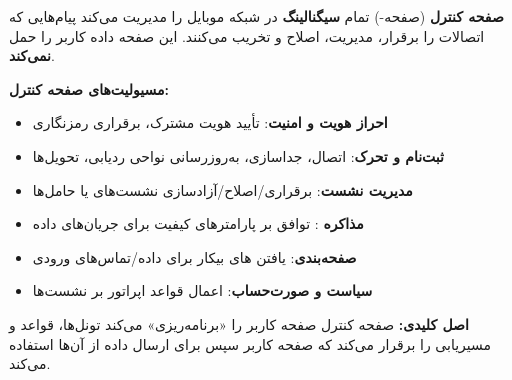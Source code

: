
\textbf{صفحه کنترل} (صفحه-) تمام \textbf{سیگنالینگ} در شبکه موبایل را مدیریت می‌کند  پیام‌هایی که اتصالات را برقرار، مدیریت، اصلاح و تخریب می‌کنند. این صفحه داده کاربر را حمل \textbf{نمی‌کند}.

\textbf{مسیولیت‌های صفحه کنترل:}

\begin{itemize}
\tightlist
\item
  \textbf{احراز هویت و امنیت}: تأیید هویت مشترک، برقراری رمزنگاری
\item
  \textbf{ثبت‌نام و تحرک}: اتصال، جداسازی، به‌روزرسانی نواحی ردیابی، تحویل‌ها
\item
  \textbf{مدیریت نشست}: برقراری/\allowbreak{}اصلاح/\allowbreak{}آزادسازی نشست‌های  یا حامل‌ها
\item
  \textbf{مذاکره }: توافق بر پارامترهای کیفیت برای جریان‌های داده
\item
  \textbf{صفحه‌بندی}: یافتن های بیکار برای داده/\allowbreak{}تماس‌های ورودی
\item
  \textbf{سیاست و صورت‌حساب}: اعمال قواعد اپراتور بر نشست‌ها
\end{itemize}

\textbf{اصل کلیدی:} صفحه کنترل صفحه کاربر را «برنامه‌ریزی» می‌کند  تونل‌ها، قواعد و مسیریابی را برقرار می‌کند که صفحه کاربر سپس برای ارسال داده از آن‌ها استفاده می‌کند.



